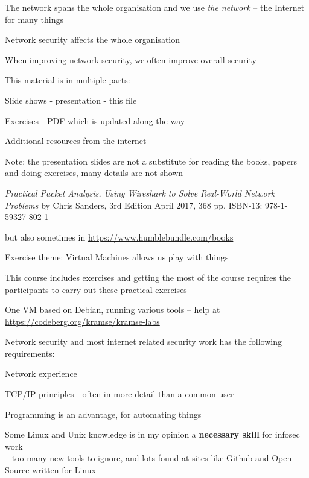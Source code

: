 \documentclass[Screen16to9,17pt]{foils}
\begin{document}
\begin{list2}
\item The network spans the whole organisation and we use \emph{the network} -- the Internet for many things
\item Network security affects the whole organisation
\item When improving network security, we often improve overall security
\end{list2}



\begin{list1}
\item This material is in multiple parts:

\item Slide shows - presentation - this file
\item Exercises - PDF which is updated along the way

\item Additional resources from the internet

\end{list1}

{\Large Note: the presentation slides are not a substitute for reading the books, papers and doing exercises, many details are not shown}


\emph{Practical Packet Analysis,
Using Wireshark to Solve Real-World Network Problems}
by Chris Sanders, 3rd Edition
April 2017, 368 pp.
ISBN-13:
978-1-59327-802-1

 but also sometimes in \url{https://www.humblebundle.com/books}



Exercise theme: Virtual Machines allows us play with things

\begin{list1}
\item This course includes exercises and getting the most of the course requires the participants to carry out these practical exercises
\item One VM based on Debian, running various tools -- help at \url{https://codeberg.org/kramse/kramse-labs}
\item Network security and most internet related security work has the following requirements:
\begin{list2}
\item Network experience
\item TCP/IP principles - often in more detail than a common user
\item Programming is an advantage, for automating things
\item Some Linux and Unix knowledge is in my opinion a {\bf necessary skill} for infosec work\\
-- too many new tools to ignore, and lots found at sites like Github and Open Source written for Linux
\end{list2}
\end{list1}
\end{document}
